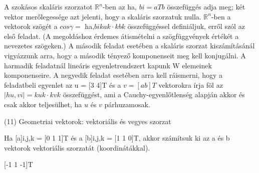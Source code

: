 \begin{frame}
  \begin{tcolorbox}[title={10/4. -Q-}]
    A szokásos skaláris szorzatot $\mathbb{R}^n$-ben az ha, $bi = aTb$ összefüggés adja meg; két vektor merőlegessége azt jelenti, hogy a skaláris szorzatuk nulla. $\mathbb{R}^n$-ben a vektorok szögét a $cos{\gamma} =$ ha,$bi kak \cdot kbk$ összefüggéssel definiáljuk, erről szól az első feladat. (A megoldáshoz érdemes átismételni a szögfüggvények értékét a nevezetes szögeken.) A második feladat esetében a skaláris szorzat kiszámításánál vigyázzunk arra, hogy a második tényező komponenseit meg kell konjugálni. A harmadik feladatnál lineáris egyenletrendszert kapunk W elemeinek komponenseire. A negyedik feladat esetében arra kell ráismerni, hogy a feladatbeli egyenlet az u = [3 4]T és a $v = [a b]T$ vektorokra írja föl az $|hu,vi| = kuk \cdot kvk$ összefüggést, ami a Cauchy-egyenlőtlenség alapján akkor és csak akkor teljesülhet, ha $u$ és $v$ párhuzamosak.
  \end{tcolorbox}
\end{frame}


\begin{frame}[plain]
\begin{tcolorbox}[center, colback={myyellow}, coltext={black}, colframe={myyellow}]
    {\RHuge  (11) Geometriai vektorok: vektoriális és vegyes szorzat }
    \mmedskip
\end{tcolorbox}
\end{frame}

\begin{frame}
  \begin{tcolorbox}[title={11/1. -N-}]
    Ha [a]i,j,k = [0 1 1]T és a [b]i,j,k = [1 1 0]T, akkor számítsuk ki az a és b vektorok vektoriális szorzatát (koordinátákkal).

  \tcblower

    \mmedskip 
    
    [-1 1 -1]T
  \end{tcolorbox}
\end{frame}


